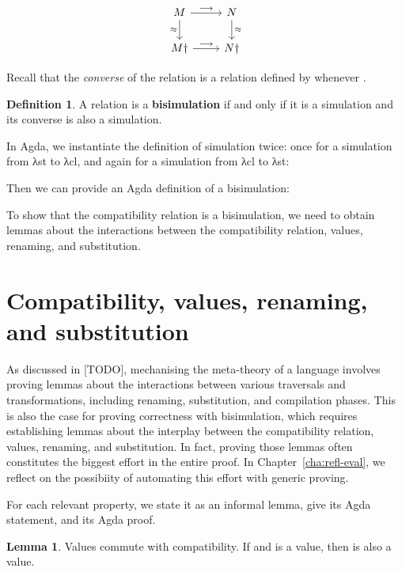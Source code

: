 \documentclass[bsc,frontabs,oneside,singlespacing,parskip,deptreport]{infthesis}
\theoremstyle{definition}
\newtheorem*{definition}{Definition}
\theoremstyle{lemma}
\newtheorem*{lemma}{Lemma}
\begin{document}
\[ \begin{tikzcd}
M \arrow{r}{\longrightarrow} \arrow[swap]{d}{\approx} & N \arrow{d}{\approx} \\%
M \dagger \arrow{r}{\longrightarrow}& N \dagger
\end{tikzcd}
\]

Recall that the \textit{converse} of the relation  is a relation
 defined by  whenever .

\begin{definition}
  A relation  is a \textbf{bisimulation} if and only if it is a
  simulation and its converse is also a simulation.
\end{definition}

In Agda, we instantiate the definition of simulation twice: once for a
simulation from λst to λcl, and again for a simulation from λcl to
λst:


Then we can provide an Agda definition of a bisimulation:


To show that the compatibility relation is a bisimulation, we need to
obtain lemmas about the interactions between the compatibility
relation, values, renaming, and substitution.

\section{Compatibility, values, renaming, and substitution}
\label{sec:comp-valu-renam}

As discussed in [TODO], mechanising the meta-theory of a language
involves proving lemmas about the interactions between various
traversals and transformations, including renaming, substitution, and
compilation phases. This is also the case for proving correctness with
bisimulation, which requires establishing lemmas about the interplay
between the compatibility relation, values, renaming, and
substitution. In fact, proving those lemmas often constitutes the
biggest effort in the entire proof. In Chapter~\ref{cha:refl-eval}, we
reflect on the possibiity of automating this effort with generic
proving.

For each relevant property, we state it as an informal lemma, give its
Agda statement, and its Agda proof.

\begin{lemma}{Values commute with compatibility.}
  If  and  is a value, then  is also a
  value.
\end{lemma}
\end{document}
